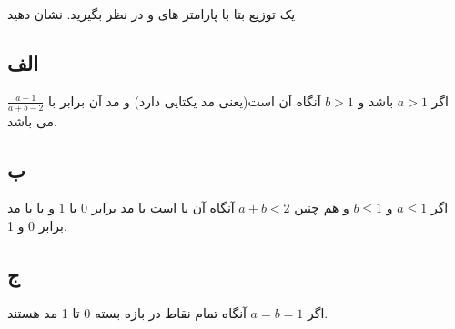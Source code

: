 
یک توزیع بتا با پارامتر های  و  در نظر بگیرید. نشان دهید\\

\subsection*{الف}
اگر $a > 1$ باشد و $b > 1$ آنگاه  آن  است(یعنی مد یکتایی دارد) و مد آن برابر با $\frac{a - 1}{a + b - 2}$ می باشد.
\subsection*{ب}
اگر $a \leq 1$ و $b \leq 1$ و هم چنین $a + b < 2$ آنگاه  آن یا  است با مد برابر 0 یا 1 و یا  با مد برابر 0 و 1.
\subsection*{ج}
اگر $a = b = 1$ آنگاه تمام نقاط در بازه بسته 0 تا 1 مد هستند.


